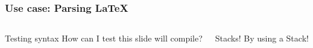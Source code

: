 \begin{frame}
	\frametitle{Use case: Parsing \LaTeX}
	\begin{columns}
		
		\pause
		\begin{questionblock}{Testing syntax}
			How can I test this slide will compile?
		\end{questionblock}
		\pause
		\begin{answerblock}{Stacks!}
			By using a Stack!
		\end{answerblock}
	\end{columns}
\end{frame}
